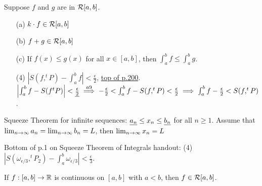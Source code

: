\documentclass[]{article}
\begin{document}
\begin{theorem}
	 Suppose \ul{$f$} and \ul{$g$} are in $\mathcal{R}[a,b]$.
	\begin{enumerate}
		\item[(a)] $k\cdot f \in\mathcal{R}[a,b]$
		\item[(b)] $f+g \in\mathcal{R}[a,b]$
		\item[(c)] If $f(x) \leq g(x)$ for all $x\in[a,b]$, then $\int_a^b f \leq \int_a^b g$.
		\item[(4)] $\left| S(f,^tP)-\int_a^bf \right| < \frac{\epsilon}{2}$, \ul{top of p.200}. $\left| \int_a^b f - S(f^tP) \right| < \underline{\frac{\epsilon}{2}} \overset{a9}{\implies} -\frac{\epsilon}{2} < \int_a^b f - S(f,^tP) < \frac{\epsilon}{2} \implies \int_a^b f - \frac{\epsilon}{2} < S(f,^tP)$. 
	\end{enumerate}
\end{theorem}
\begin{recall}
	Squeeze Theorem for infinite sequences: $\underline{a_n} \leq x_n \leq \underline{b_n}$ for all $n\geq 1$. Assume that $\lim_{n\rightarrow\infty} a_n = \lim_{n\rightarrow\infty} b_n = L$, then $\lim_{n\rightarrow\infty} x_n = L$
\end{recall}

Bottom of p.1 on Squeeze Theorem of Integrals handout: (4) $\left| S(\omega_{\epsilon/3},^tP_2) - \int_a^b \omega_{\epsilon/3} \right| < \frac{\epsilon}{3}$.

\begin{theorem}
	 If $f:[a,b]\rightarrow\mathbb{R}$ is continuous on $[a,b]$ with \ul{$a<b$}, then $f\in\mathcal{R}[a,b]$.
\end{theorem}
\end{document}
